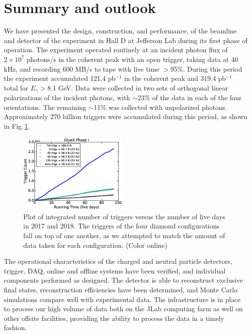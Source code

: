 
\section{Summary and outlook\label{sec:summary} }
We have presented the design, construction, and performance, of the beamline and detector of the \gx{} experiment in Hall D at Jefferson Lab during its first phase of operation. The experiment operated routinely at an incident photon flux of $2\times 10^{7}$ photons/s in the coherent peak with an open trigger, taking data at 40 kHz, and recording 600 MB/s to tape with live time $>$95\%. During this period the experiment accumulated  121.4 pb$^{-1}$ in the coherent peak and 319.4 pb$^{-1}$ total for $E_\gamma>$8.1 GeV. Data were collected in two sets of orthogonal linear polarizations of the incident photons, with $\sim$23\% of the data in each of the four orientations. The remaining $\sim$11\% was collected with unpolarized photons. Approximately 270 billion triggers were accumulated during this period, as shown in Fig.\,\ref{fig:plot_rcdb3_phaseI}.  

\begin{figure}[tbh]\centering
\includegraphics[width=0.48\textwidth]{figures/plot_rcdb3_phaseI.eps}
\caption{\label{fig:plot_rcdb3_phaseI} 
Plot of integrated number of triggers versus the number of live days in 2017 and 2018. The triggers of the four diamond configurations fall on top of one another, as we attempted to match the amount of data taken for each configuration. 
(Color online)
 }
\end{figure}   

The operational characteristics of the charged and neutral particle detectors, trigger, DAQ, online and offline systems have been verified, and individual components performed as designed. The detector is able to reconstruct exclusive final states, reconstruction efficiencies have been determined, and Monte Carlo simulations compare well with experimental data. The infrastructure is in place to process our high volume of data both on the JLab computing farm as well on other offsite facilities, providing the ability to process the data in a timely fashion.

